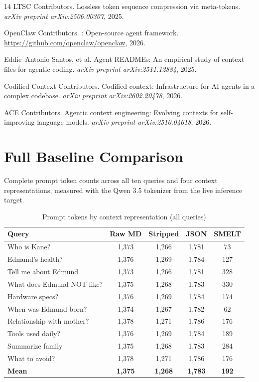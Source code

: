 \documentclass[11pt,a4paper]{article}
\begin{document}
\begin{thebibliography}{14}
LTSC Contributors.
\newblock Lossless token sequence compression via meta-tokens.
\newblock \textit{arXiv preprint arXiv:2506.00307}, 2025.

OpenClaw Contributors.
: Open-source agent framework.
\newblock \url{https://github.com/openclaw/openclaw}, 2026.

Eddie~Antonio Santos, et al.
\newblock Agent {READMEs}: An empirical study of context files for agentic coding.
\newblock \textit{arXiv preprint arXiv:2511.12884}, 2025.

Codified Context Contributors.
\newblock Codified context: Infrastructure for {AI} agents in a complex codebase.
\newblock \textit{arXiv preprint arXiv:2602.20478}, 2026.

ACE Contributors.
\newblock Agentic context engineering: Evolving contexts for self-improving language models.
\newblock \textit{arXiv preprint arXiv:2510.04618}, 2026.

\end{thebibliography}

\appendix

\section{Full Baseline Comparison}
\label{app:baselines}

Complete prompt token counts across all ten queries and four context representations, measured with the Qwen 3.5 tokenizer from the live inference target.

\begin{table}[H]
\centering
\caption{Prompt tokens by context representation (all queries)}
\begin{tabular}{lcccc}
\toprule
\textbf{Query} & \textbf{Raw MD} & \textbf{Stripped} & \textbf{JSON} & \textbf{SMELT} \\
\midrule
Who is Kane? & 1,373 & 1,266 & 1,781 & 73 \\
Edmund's health? & 1,376 & 1,269 & 1,784 & 127 \\
Tell me about Edmund & 1,373 & 1,266 & 1,781 & 328 \\
What does Edmund NOT like? & 1,375 & 1,268 & 1,783 & 330 \\
Hardware specs? & 1,376 & 1,269 & 1,784 & 174 \\
When was Edmund born? & 1,374 & 1,267 & 1,782 & 62 \\
Relationship with mother? & 1,378 & 1,271 & 1,786 & 176 \\
Tools used daily? & 1,376 & 1,269 & 1,784 & 189 \\
Summarize family & 1,375 & 1,268 & 1,783 & 284 \\
What to avoid? & 1,378 & 1,271 & 1,786 & 176 \\
\midrule
\textbf{Mean} & \textbf{1,375} & \textbf{1,268} & \textbf{1,783} & \textbf{192} \\
\bottomrule
\end{tabular}
\end{table}
\end{document}
